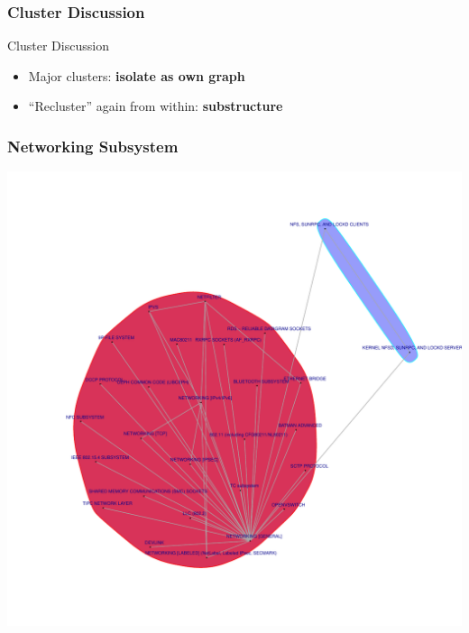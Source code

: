 \documentclass[9pt]{beamer}
\begin{document}
	\begin{frame}
	\frametitle{Cluster Discussion}
		\begin{block}{Cluster Discussion}
			\begin{itemize}
				\item Major clusters: \textbf{isolate as own graph}
				\item ``Recluster'' again from within: \textbf{substructure}
			\end{itemize}
		\end{block}
		
	\end{frame}


	\begin{frame}
	\frametitle{Networking Subsystem}
	\begin{center}
	\includegraphics[scale=0.3]{clusters/4_networking_general.pdf}
	\end{center}
\end{frame}
\end{document}

